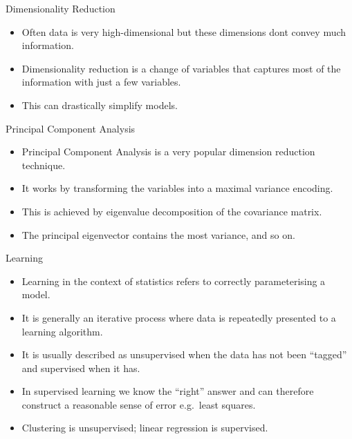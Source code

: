 \documentclass[
  ignorenonframetext,
]{beamer}
\begin{document}
\begin{frame}{Dimensionality Reduction}
\protect\hypertarget{dimensionality-reduction}{}
\begin{itemize}
\item
  Often data is very high-dimensional but these dimensions dont convey
  much information.
\item
  Dimensionality reduction is a change of variables that captures most
  of the information with just a few variables.
\item
  This can drastically simplify models.
\end{itemize}
\end{frame}

\begin{frame}{Principal Component Analysis}
\protect\hypertarget{principal-component-analysis}{}
\begin{itemize}
\item
  Principal Component Analysis is a very popular dimension reduction
  technique.
\item
  It works by transforming the variables into a maximal variance
  encoding.
\item
  This is achieved by eigenvalue decomposition of the covariance matrix.
\item
  The principal eigenvector contains the most variance, and so on.
\end{itemize}
\end{frame}

\begin{frame}{Learning}
\protect\hypertarget{learning}{}
\begin{itemize}
\item
  Learning in the context of statistics refers to correctly
  parameterising a model.
\item
  It is generally an iterative process where data is repeatedly
  presented to a learning algorithm.
\item
  It is usually described as unsupervised when the data has not been
  ``tagged'' and supervised when it has.
\item
  In supervised learning we know the ``right'' answer and can therefore
  construct a reasonable sense of error e.g.~least squares.
\item
  Clustering is unsupervised; linear regression is supervised.
\end{itemize}
\end{frame}
\end{document}
